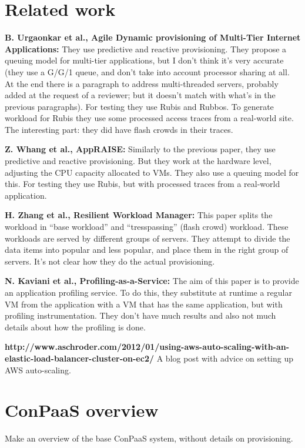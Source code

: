 \documentclass[10pt,twocolumn]{article}
\begin{document}
\section*{Related work}

{\bf B. Urgaonkar et al., Agile Dynamic provisioning of Multi-Tier Internet Applications:}
They use predictive and reactive provisioning. They propose a queuing model
for multi-tier applications, but I don't think it's very accurate (they use
a G/G/1 queue, and don't take into account processor sharing at all. At
the end there is a paragraph to address multi-threaded servers, probably
added at the request of a reviewer; but it doesn't match with what's 
in the previous paragraphs). For testing they use Rubis and Rubbos. To generate
workload for Rubis they use some processed access traces from a real-world site.
The interesting part: they did have flash crowds in their traces. 

{\bf Z. Whang et al., AppRAISE:}
Similarly to the previous paper, they use predictive and reactive provisioning.
But they work at the hardware level, adjusting the CPU capacity allocated to
VMs. They also use a queuing model for this. For testing they use Rubis,
but with processed traces from a real-world application.

{\bf H. Zhang et al., Resilient Workload Manager:} 
This paper splits the workload in ``base workload'' and ``tresspassing'' (flash crowd)
workload. These workloads are served by different groups of servers. They attempt to 
divide the data items into popular and less popular, and place them in the right
group of servers. It's not clear how they do the actual provisioning.

{\bf N. Kaviani et al., Profiling-as-a-Service:}
The aim of this paper is to provide an application profiling service. To do
this, they substitute at runtime a regular VM from the application with
a VM that has the same application, but with profiling instrumentation.
They don't have much results and also not much details about how the
profiling is done.

{\bf http://www.aschroder.com/2012/01/using-aws-auto-scaling-with-an-elastic-load-balancer-cluster-on-ec2/ }
A blog post with advice on setting up AWS auto-scaling.

\section*{ConPaaS overview}

Make an overview of the base ConPaaS system, without details on  
provisioning.
\end{document}

